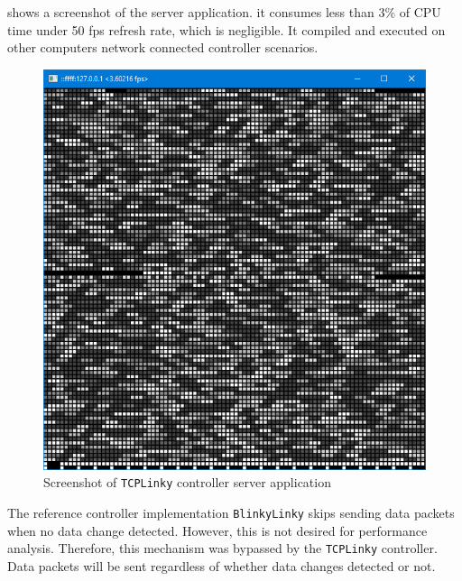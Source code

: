  shows a screenshot of the server application.   it consumes less than $3 \%$ of CPU time under 50 fps refresh rate, which is negligible. It  compiled and executed on other computers  network connected controller scenarios. 

\begin{figure}[t]
  \centering
  \includegraphics[width=0.6\columnwidth]{Figs/tcplinky_server.png}
  \caption{\footnotesize Screenshot of \texttt{TCPLinky} controller server application}
  \label{fig:tcplinky_server}
\end{figure}

The reference controller implementation \texttt{BlinkyLinky} skips sending data packets when no data change  detected. However, this is not desired for performance analysis. Therefore, this mechanism was bypassed by the \texttt{TCPLinky} controller. Data packets will be sent regardless of whether data changes  detected or not.



